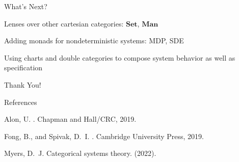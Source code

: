 \documentclass{beamer}
\begin{document}
\begin{frame}{What's Next?}
    \begin{large}
        Lenses over other cartesian categories: $\textbf{Set}$, $\textbf{Man}$

        \vspace*{0.25in}
        Adding monads for nondeterministic systems: MDP, SDE

        \vspace*{0.25in}
        Using charts and double categories to compose system behavior as well as specification
    \end{large}

\end{frame}




\begin{frame}{}
    \begin{center}
        \begin{Huge}
            Thank You!
        \end{Huge}
    \end{center}
\end{frame}


\begin{frame}{References}
    \begin{thebibliography}{10}

        {\sc Alon, U.}
        .
        \newblock Chapman and Hall/CRC, 2019.

        {\sc Fong, B., and Spivak, D.~I.}
        .
        \newblock Cambridge University Press, 2019.

        {\sc Myers, D.~J.}
        \newblock Categorical systems theory.
         (2022).
    \end{thebibliography}
\end{frame}
\end{document}
